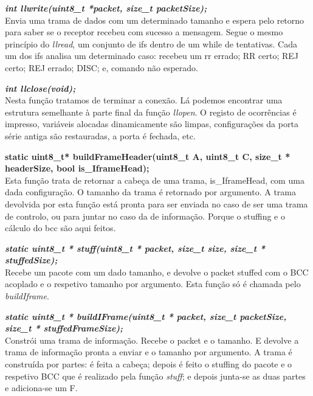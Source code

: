 \documentclass[a4paper]{article}
\begin{document}
\noindent\textbf{\textit{int llwrite(uint8\_t *packet, size\_t packetSize);}}\\
Envia uma trama de dados com um determinado tamanho e espera pelo retorno para
saber se o receptor recebeu com sucesso a mensagem. Segue o mesmo
princípio do \textit{llread}, um conjunto de ifs dentro de um while de
tentativas. Cada um dos ifs analisa um determinado caso: recebeu um rr errado;
RR certo; REJ certo; REJ errado; DISC; e, comando não esperado.\linebreak

\noindent\textbf{\textit{int llclose(void);}}\\
Nesta função tratamos de terminar a conexão. Lá podemos encontrar uma estrutura
semelhante à parte final da função \textit{llopen}. O registo de ocorrências é
impresso, variáveis alocadas dinamicamente são limpas, configurações da porta
série antiga são restauradas, a porta é fechada, etc.\linebreak

\noindent\textbf{static uint8\_t* buildFrameHeader(uint8\_t A, uint8\_t C,
size\_t * headerSize, bool is\_IframeHead);}\\
Esta função trata de retornar a cabeça de uma trama,
is\_IframeHead, com uma dada configuração. O tamanho da trama é retornado por
argumento. A trama devolvida por esta função está pronta para ser enviada no caso de
ser uma trama de controlo, ou para juntar no caso da de informação. Porque o
stuffing e o cálculo do bcc são aqui feitos.\linebreak

\noindent\textbf{\textit{static uint8\_t * stuff(uint8\_t * packet, size\_t size,
size\_t * stuffedSize);}}\\
Recebe um pacote com um dado tamanho, e devolve o packet stuffed com o BCC
acoplado e o respetivo tamanho por argumento. Esta função só é chamada pelo
\textit{buildIframe}.
\linebreak

\noindent\textbf{\textit{static uint8\_t * buildIFrame(uint8\_t * packet, size\_t
packetSize, size\_t * stuffedFrameSize);}}\\
Constrói uma trama de informação. Recebe o packet e o tamanho. E devolve a
trama de informação pronta a enviar e o tamanho por argumento. A trama é
construída por partes: é feita a cabeça; depois é feito o stuffing do pacote e
o respetivo BCC que é realizado pela função \textit{stuff}; e depois junta-se as
duas partes e adiciona-se um F.\linebreak
\end{document}
